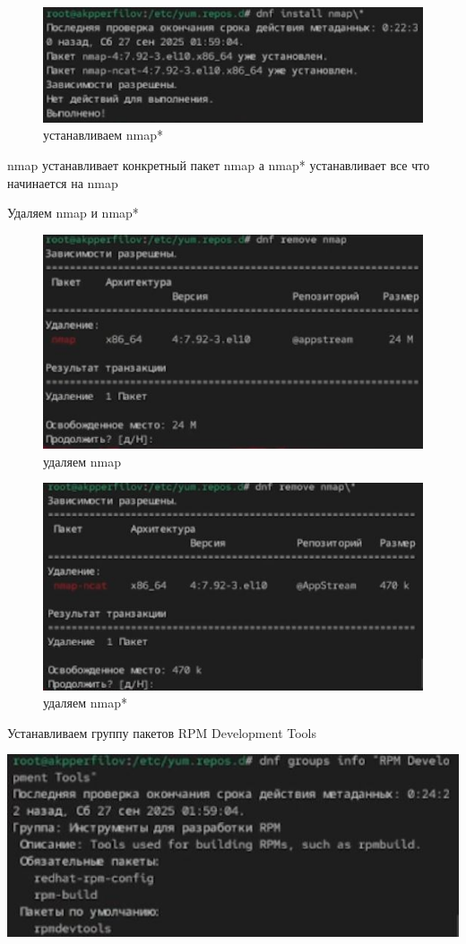 \documentclass[
  english,
  russian,
  12pt,
  a4paper,
  DIV=11,
  numbers=noendperiod]{scrreprt}
\begin{document}
\begin{figure}

{\centering \includegraphics[width=0.3\linewidth,height=\textheight,keepaspectratio]{image/8.jpg}

}

\caption{устанавливаем nmap*}

\end{figure}%

nmap устанавливает конкретный пакет nmap а nmap* устанавливает все что
начинается на nmap

Удаляем nmap и nmap*

\begin{figure}

{\centering \includegraphics[width=0.3\linewidth,height=\textheight,keepaspectratio]{image/9.jpg}

}

\caption{удаляем nmap}

\end{figure}%

\begin{figure}

{\centering \includegraphics[width=0.3\linewidth,height=\textheight,keepaspectratio]{image/10.jpg}

}

\caption{удаляем nmap*}

\end{figure}%

Устанавливаем группу пакетов RPM Development Tools

\includegraphics[width=0.2\linewidth,height=\textheight,keepaspectratio]{image/11.jpg}
\end{document}
